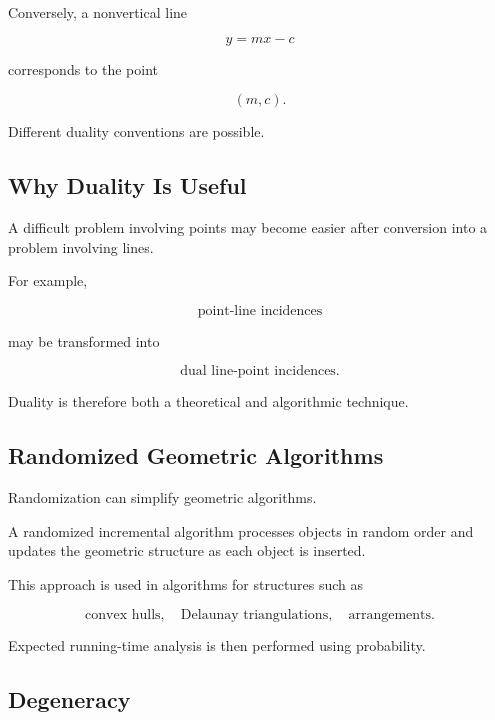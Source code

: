 Conversely, a nonvertical line

\[
y=mx-c
\]

corresponds to the point

\[
\boxed{
(m,c).
}
\]

Different duality conventions are possible.

\subsection{Why Duality Is Useful}
\label{subsec:why-computational-duality}

A difficult problem involving points may become easier after conversion into
a problem involving lines.

For example,

\[
\boxed{
\text{point-line incidences}
}
\]

may be transformed into

\[
\boxed{
\text{dual line-point incidences}.
}
\]

Duality is therefore both a theoretical and algorithmic technique.

\subsection{Randomized Geometric Algorithms}
\label{subsec:randomized-geometric-algorithms}

Randomization can simplify geometric algorithms.

A randomized incremental algorithm processes objects in random order and
updates the geometric structure as each object is inserted.

This approach is used in algorithms for structures such as

\[
\boxed{
\text{convex hulls},
\quad
\text{Delaunay triangulations},
\quad
\text{arrangements}.
}
\]

Expected running-time analysis is then performed using probability.

\subsection{Degeneracy}
\label{subsec:computational-degeneracy}

